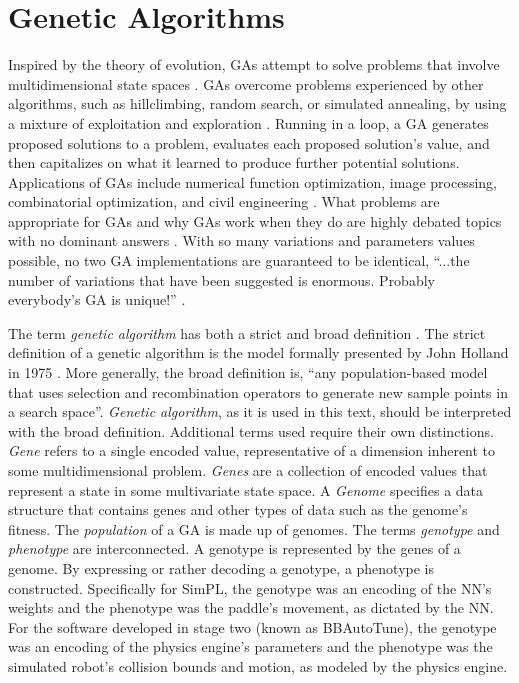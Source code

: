 \section{Genetic Algorithms}

Inspired by the theory of evolution, GAs attempt to solve problems that involve multidimensional state spaces \cite{ColinReeves}\cite{Beasley93anoverview}. GAs overcome problems experienced by other algorithms, such as hillclimbing, random search, or simulated annealing, by using a mixture of exploitation and exploration \cite{Beasley93anoverview}. Running in a loop, a GA generates proposed solutions to a problem, evaluates each proposed solution's value, and then capitalizes on what it learned to produce further potential solutions. Applications of GAs include numerical function optimization, image processing, combinatorial optimization, and civil engineering \cite{Beasley93anoverview}. What problems are appropriate for GAs and why GAs work when they do are highly debated topics with no dominant answers \cite{ColinReeves}. With so many variations and parameters values possible, no two GA implementations are guaranteed to be identical, ``...the number of variations that have been suggested is enormous. Probably everybody's GA is unique!'' \cite{ColinReeves}.

The term \textit{genetic algorithm} has both a strict and broad definition \cite{Whitley94agenetic}. The strict definition of a genetic algorithm is the model formally presented by John Holland in 1975 \cite{ColinReeves}. More generally, the broad definition is, ``any population-based model that uses selection and recombination operators to generate new sample points in a search space''\cite{Whitley94agenetic}. \textit{Genetic algorithm}, as it is used in this text, should be interpreted with the broad definition. Additional terms used require their own distinctions. \textit{Gene} refers to a single encoded value, representative of a dimension inherent to some multidimensional problem. \textit{Genes} are a collection of encoded values that represent a state in some multivariate state space. A \textit{Genome} specifies a data structure that contains genes and other types of data such as the genome's fitness. The \textit{population} of a GA is made up of genomes. The terms \textit{genotype} and \textit{phenotype} are interconnected. A genotype is represented by the genes of a genome. By expressing or rather decoding a genotype, a phenotype is constructed. Specifically for SimPL, the genotype was an encoding of the NN's weights and the phenotype was the paddle's movement, as dictated by the NN. For the software developed in stage two (known as BBAutoTune), the genotype was an encoding of the physics engine's parameters and the phenotype was the simulated robot's collision bounds and motion, as modeled by the physics engine.           

